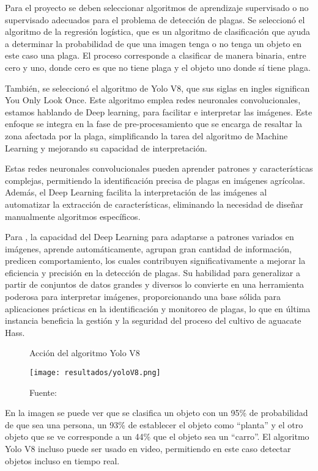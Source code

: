 Para el proyecto se deben seleccionar algoritmos de aprendizaje supervisado o no supervisado adecuados para el problema de detección de plagas. Se seleccionó el algoritmo de la regresión logística, que es un algoritmo de clasificación que ayuda a determinar la probabilidad de que una imagen tenga o no tenga un objeto en este caso una plaga. El proceso corresponde a clasificar de manera binaria, entre cero y uno, donde cero es que no tiene plaga y el objeto uno donde sí tiene plaga.

También, se seleccionó el algoritmo de Yolo V8, que sus siglas en ingles significan You Only Look Once. Este algoritmo emplea redes neuronales convolucionales, estamos hablando de Deep learning, para facilitar e interpretar las imágenes. Este enfoque se integra en la fase de pre-procesamiento que se encarga de resaltar la zona afectada por la plaga, simplificando la tarea del algoritmo de Machine Learning y mejorando su capacidad de interpretación.

Estas redes neuronales convolucionales pueden aprender patrones y características complejas, permitiendo la identificación precisa de plagas en imágenes agrícolas. Además, el Deep Learning facilita la interpretación de las imágenes al automatizar la extracción de características, eliminando la necesidad de diseñar manualmente algoritmos específicos.

\newpage

Para \cite{schmidhuber2015deep}, la capacidad del Deep Learning para adaptarse a patrones variados en imágenes, aprende automáticamente, agrupan gran cantidad de información, predicen comportamiento, los cuales contribuyen significativamente a mejorar la eficiencia y precisión en la detección de plagas. Su habilidad para generalizar a partir de conjuntos de datos grandes y diversos lo convierte en una herramienta poderosa para interpretar imágenes, proporcionando una base sólida para aplicaciones prácticas en la identificación y monitoreo de plagas, lo que en última instancia beneficia la gestión y la seguridad del proceso del cultivo de aguacate Hass.

\begin{figure}[h]
\centering
\caption{Acción del algoritmo Yolo V8}
\texttt{[image: resultados/yoloV8.png]}
\caption*{\footnotesize Fuente: \cite{decoder2023}}
\label{fig:figuraYoloV8}
\end{figure}

\newpage

En la imagen se puede ver que se clasifica un objeto con un 95\% de probabilidad de que sea una persona, un 93\% de establecer el objeto como “planta” y el otro objeto que se ve corresponde a un 44\% que el objeto sea un “carro”. El algoritmo Yolo V8 incluso puede ser usado en video, permitiendo en este caso detectar objetos incluso en tiempo real.

